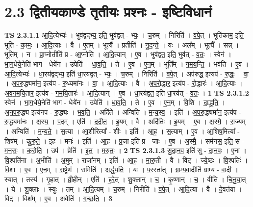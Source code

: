 \documentclass[17pt]{extarticle}
\begin{document}
\section*{ 2.3     द्वितीयकाण्डे तृतीयः प्रश्नः - इष्टिविधानं }
                                \textbf{ TS 2.3.1.1} \newline
                  आ॒दि॒त्येभ्यः॑ । भुव॑द्वद्भ्य॒ इति॒ भुव॑द्वत् - भ्यः॒ । च॒रुम् । निरिति॑ । व॒पे॒त् । भूति॑काम॒ इति॒ भूति॑ - का॒मः॒ । आ॒दि॒त्याः । वै । ए॒तम् । भूत्यै᳚ । प्रतीति॑ । नु॒द॒न्ते॒ । यः । अल᳚म् । भूत्यै᳚ । सन्न् । भूति᳚म् । न । प्रा॒प्नोतीति॑ प्र - आ॒प्नोति॑ । आ॒दि॒त्यान् । ए॒व । भुव॑द्वत॒ इति॒ भुव॑त् - व॒तः॒ । स्वेन॑ । भा॒ग॒धेये॒नेति॑ भाग - धेये॑न । उपेति॑ । धा॒व॒ति॒ । ते । ए॒व । ए॒न॒म् । भूति᳚म् । ग॒म॒य॒न्ति॒ । भव॑ति । ए॒व । आ॒दि॒त्येभ्यः॑ । धा॒रय॑द्वद्भ्य॒ इति॑ धा॒रय॑द्वत् - भ्यः॒ । च॒रुम् । निरिति॑ । व॒पे॒त् । अप॑रुद्ध॒ इत्यप॑ - रु॒द्धः॒ । वा॒ । अ॒प॒रु॒द्ध्यमा॑न॒ इत्य॑प - रु॒ध्यमा॑नः । वा॒ । आ॒दि॒त्याः । वै । अ॒प॒रो॒द्धार॒ इत्य॑प - रो॒द्धारः॑ । आ॒दि॒त्याः । अ॒व॒ग॒म॒यि॒तार॒ इत्य॑व - ग॒म॒यि॒तारः॑ । आ॒दि॒त्यान् । ए॒व । धा॒रय॑द्वत॒ इति॑ धा॒रय॑त् - व॒तः॒ । \textbf{  1} \newline
                  \newline
                                \textbf{ TS 2.3.1.2} \newline
                  स्वेन॑ । भा॒ग॒धेये॒नेति॑ भाग - धेये॑न । उपेति॑ । धा॒व॒ति॒ । ते । ए॒व । ए॒न॒म् । वि॒शि । दा॒द्ध्र॒ति॒ । अ॒न॒प॒रु॒द्ध्य इत्य॑नप - रु॒द्ध्यः । भ॒व॒ति॒ । अदि॑ते । अन्विति॑ । म॒न्य॒स्व॒ । इति॑ । अ॒प॒रु॒द्ध्यमा॑न॒ इत्य॑प - रु॒द्ध्यमा॑नः । अ॒स्य॒ । प॒दम् । एति॑ । द॒दी॒त॒ । इ॒यम् । वै । अदि॑तिः । इ॒यम् । ए॒व । अ॒स्मै॒ । रा॒ज्यम् । अन्विति॑ । म॒न्य॒ते॒ । स॒त्या । आ॒शीरित्या᳚ - शीः । इति॑ । आ॒ह॒ । स॒त्याम् । ए॒व । आ॒शिष॒मित्या᳚ - शिष᳚म् । कु॒रु॒ते॒ । इ॒ह । मनः॑ । इति॑ । आ॒ह॒ । प्र॒जा इति॑ प्र - जाः । ए॒व । अ॒स्मै॒ । सम॑नस॒ इति॒ स - म॒न॒सः॒ । क॒रो॒ति॒ । उप॑ । प्रेति॑ । इ॒त॒ । म॒रु॒तः॒ । \textbf{  2} \newline
                  \newline
                                \textbf{ TS 2.3.1.3} \newline
                  सु॒दा॒न॒व॒ इति॑ सु - दा॒न॒वः॒ । ए॒ना । वि॒श्पति॑ना । अ॒भीति॑ । अ॒मुम् । राजा॑नम् । इति॑ । आ॒ह॒ । मा॒रु॒ती । वै । विट् । ज्ये॒ष्ठः । वि॒श्पतिः॑ । वि॒शा । ए॒व । ए॒न॒म् । रा॒ष्ट्रेण॑ । समिति॑ । अ॒र्द्ध॒य॒ति॒ । यः । प॒रस्ता᳚त् । ग्रा॒म्य॒वा॒दीति॑ ग्राम्य - वा॒दी । स्यात् । तस्य॑ । गृ॒हात् । व्री॒हीन् । एति॑ । ह॒रे॒त् । शु॒क्लान् । च॒ । कृ॒ष्णान् । च॒ । वीति॑ । चि॒नु॒या॒त् । ये । शु॒क्लाः । स्युः । तम् । आ॒दि॒त्यम् । च॒रुम् । निरीति॑ । व॒पे॒त् । आ॒दि॒त्या । वै । दे॒वत॑या । विट् । विश᳚म् । ए॒व । अवेति॑ । ग॒च्छ॒ति॒ । \textbf{  3} \newline
\end{document}
